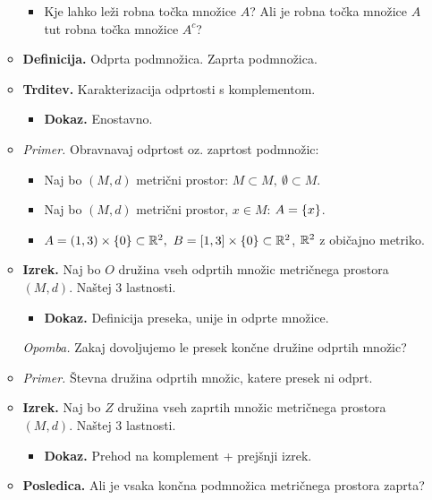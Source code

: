 \begin{enumerate}
\begin{itemize}
\begin{itemize}
            \item Kje lahko leži robna točka množice $A$? Ali je robna točka množice $A$ tut robna točka množice $A^c$?
        \end{itemize}
        \item \colorbox{purple!30}{\textbf{Definicija.}} Odprta podmnožica. Zaprta podmnožica.
        \item \colorbox{blue!30}{\textbf{Trditev.}} Karakterizacija odprtosti s komplementom.
        \begin{itemize}
            \item \colorbox{green!30}{\textbf{Dokaz.}} Enostavno.
        \end{itemize} 
        \item \colorbox{yellow!30}{\emph{Primer.}} Obravnavaj odprtost oz. zaprtost podmnožic:
        \begin{itemize}
            \item Naj bo $(M,d)$ metrični prostor: $M \subset M, \ \emptyset \subset M$.
            \item Naj bo $(M,d)$ metrični prostor, $x \in M$: $A = \left\{x\right\}$.
            \item $A = (1,3) \times \left\{0\right\} \subset \mathbb{R}^2, \ B = [1,3] \times \left\{0\right\} \subset \mathbb{R}^2$, $\mathbb{R}^2$ z običajno metriko.
        \end{itemize}
        \item \colorbox{blue!30}{\textbf{Izrek.}} Naj bo $O$ družina vseh odprtih množic metričnega prostora $(M,d)$. Naštej 3 lastnosti.
        \begin{itemize}
            \item \colorbox{green!30}{\textbf{Dokaz.}} Definicija preseka, unije in odprte množice.
        \end{itemize} 
        \colorbox{yellow!30}{\emph{Opomba.}} Zakaj dovoljujemo le presek končne družine odprtih množic?
        \item \colorbox{yellow!30}{\emph{Primer.}} Števna družina odprtih množic, katere presek ni odprt.
        \item \colorbox{blue!30}{\textbf{Izrek.}} Naj bo $Z$ družina vseh zaprtih množic metričnega prostora $(M,d)$. Naštej 3 lastnosti.
        \begin{itemize}
            \item \colorbox{green!30}{\textbf{Dokaz.}} Prehod na komplement + prejšnji izrek.
        \end{itemize} 
        \item \colorbox{orange!30}{\textbf{Posledica.}} Ali je vsaka končna podmnožica metričnega prostora zaprta?

\end{itemize}
\end{enumerate}
